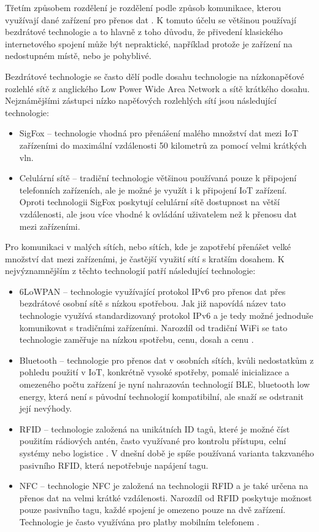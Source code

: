 Třetím způsobem rozdělení je rozdělení podle způsob komunikace, kterou využívají dané zařízení pro přenos dat \cite{8079928}. K tomuto účelu se většinou používají bezdrátové technologie a to hlavně z toho důvodu, že přivedení klasického internetového spojení může být nepraktické, například protože je zařízení na nedostupném místě, nebo je pohyblivé. 

Bezdrátové technologie se často dělí podle dosahu technologie na nízkonapěťové rozlehlé sítě z anglického Low Power Wide Area Network a sítě krátkého dosahu. Nejznámějšími zástupci nízko napěťových rozlehlých sítí jsou následující technologie:

\begin{itemize}
\item SigFox -- technologie vhodná pro přenášení malého množství dat mezi IoT zařízeními do maximální vzdálenosti 50 kilometrů za pomocí velmi krátkých vln.
\item Celulární sítě -- tradiční technologie většinou používaná pouze k připojení telefonních zařízeních, ale je možné je využít i k připojení IoT zařízení. Oproti technologii SigFox poskytují celulární sítě dostupnost na větší vzdálenosti, ale jsou více vhodné k ovládání uživatelem než k přenosu dat mezi zařízeními.
\end{itemize}

Pro komunikaci v malých sítích, nebo sítích, kde je zapotřebí přenášet velké množství dat mezi zařízeními, je častější využití sítí s kratším dosahem. K nejvýznamnějším z těchto technologií patří následující technologie:

\begin{itemize}
\item 6LoWPAN -- technologie využívající protokol IPv6 pro přenos dat přes bezdrátové osobní sítě s nízkou spotřebou. Jak již napovídá název tato technologie využívá standardizovaný protokol IPv6 a je tedy možné jednoduše komunikovat s tradičními zařízeními. Narozdíl od tradiční WiFi se tato technologie zaměřuje na nízkou spotřebu, cenu, dosah a cenu \cite{rfc4919}.

\item Bluetooth -- technologie pro přenos dat v osobních sítích, kvůli nedostatkům z pohledu použití v IoT, konkrétně vysoké spotřeby, pomalé inicializace a omezeného počtu zařízení je nyní nahrazován technologií BLE, bluetooth low energy, která není s původní technologií kompatibilní, ale snaží se odstranit její nevýhody.
\item RFID -- technologie založená na unikátních ID tagů, které je možné číst použitím rádiových antén, často využívané pro kontrolu přístupu, celní systémy nebo logistice \cite{10.1007/11687238_36}. V dnešní době je spíše používaná varianta takzvaného pasivního RFID, která nepotřebuje napájení tagu.
\item NFC -- technologie NFC je založená na technologii RFID a je také určena na přenos dat na velmi krátké vzdálenosti. Narozdíl od RFID poskytuje možnost pouze pasivního tagu, každé spojení je omezeno pouze na dvě zařízení. Technologie je často využívána pro platby mobilním telefonem \cite{coskun2011near}.
\end{itemize}

